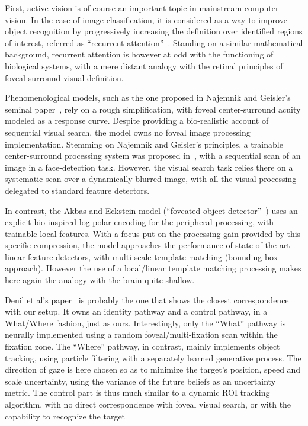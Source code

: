 First, active vision is of course an important topic in mainstream computer vision. In the case of image classification, it is considered as a way to improve object recognition by progressively increasing the definition over identified regions of interest, referred as ``recurrent attention''~\cite{mnih2014recurrent,fu2017look}. Standing on a similar mathematical background, recurrent attention is however at odd with the functioning of biological systems, with a mere distant analogy with the retinal principles of foveal-surround visual definition.

Phenomenological models, such as the one proposed in Najemnik and Geisler's seminal paper~\cite{Najemnik05}, rely on a rough simplification, with foveal center-surround acuity modeled as a response curve. Despite providing a bio-realistic account of sequential visual search, the model owns no foveal image processing implementation. Stemming on Najemnik and Geisler's principles, a trainable center-surround processing system was proposed in~\cite{Butko2010infomax}, with a sequential scan of an image in a face-detection task. However, the visual search task relies there on a systematic scan over a dynamically-blurred image, with all the visual processing delegated to standard feature detectors.

In contrast, the Akbas and Eckstein model (“foveated object detector”~\cite{akbas2017object}) uses an explicit bio-inspired log-polar encoding
for the peripheral processing, with trainable local features.
With a focus put on the processing gain provided by this specific compression,
the model approaches the performance of state-of-the-art linear feature detectors, with multi-scale template matching (bounding box approach). However the use of
a local/linear template matching processing makes here again the analogy with the brain quite shallow.

Denil et al's paper~\cite{denil2012learning} is probably the one that shows the closest correspondence with our setup. It owns an identity pathway and a control pathway, in a What/Where fashion, just as ours. Interestingly, only the ``What'' pathway is neurally implemented using a random foveal/multi-fixation scan within the fixation zone. The ``Where'' pathway, in contrast, mainly implements object tracking, using particle filtering with a separately learned generative process. The direction of gaze is here chosen so as to minimize the target's position, speed and scale uncertainty, using the variance of the future beliefs as an uncertainty metric. The control part is thus much similar to a dynamic ROI tracking algorithm, with no direct correspondence with foveal visual search, or with the capability to recognize the target
%
